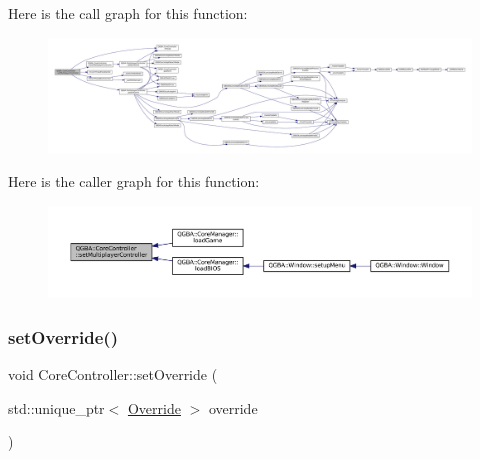 Here is the call graph for this function\+:
\nopagebreak
\begin{figure}[H]
\begin{center}
\leavevmode
\includegraphics[width=350pt]{class_q_g_b_a_1_1_core_controller_a222d740640682346f2ee8725641727ee_cgraph}
\end{center}
\end{figure}
Here is the caller graph for this function\+:
\nopagebreak
\begin{figure}[H]
\begin{center}
\leavevmode
\includegraphics[width=350pt]{class_q_g_b_a_1_1_core_controller_a222d740640682346f2ee8725641727ee_icgraph}
\end{center}
\end{figure}
\mbox{\label{class_q_g_b_a_1_1_core_controller_a90b751511ea4c1c1f76f68b7aa278a9c}} 
\subsubsection{\texorpdfstring{set\+Override()}{setOverride()}}
{\footnotesize\ttfamily void Core\+Controller\+::set\+Override (\begin{DoxyParamCaption}\item[{std\+::unique\+\_\+ptr$<$ \mbox{\hyperlink{class_q_g_b_a_1_1_override}{Override}} $>$}]{override }\end{DoxyParamCaption})}

\mbox{\label{class_q_g_b_a_1_1_core_controller_a83007f6bad9e6a8414cbd71c7a498578}} 
